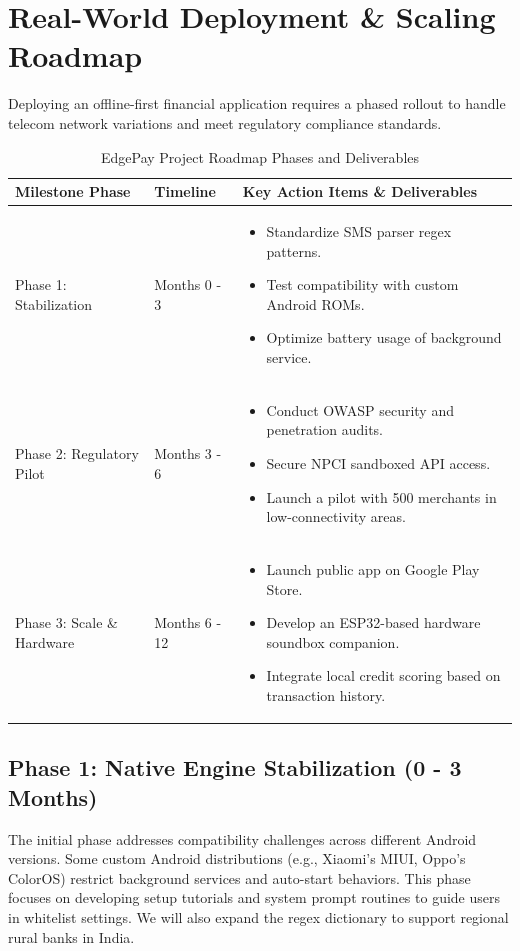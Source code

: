 \documentclass[10pt,journal,compsoc]{IEEEtran}
\begin{document}
\section{Real-World Deployment \& Scaling Roadmap}
Deploying an offline-first financial application requires a phased rollout to handle telecom network variations and meet regulatory compliance standards.

\begin{table}[htbp]
\caption{EdgePay Project Roadmap Phases and Deliverables}
\label{tab:roadmap_milestones}
\centering
\scriptsize
\begin{tabular}{lp{2.5cm}p{9.5cm}}
\toprule
\textbf{Milestone Phase} & \textbf{Timeline} & \textbf{Key Action Items \& Deliverables} \\
\midrule
Phase 1: Stabilization & Months 0 - 3 & \begin{itemize} \item Standardize SMS parser regex patterns. \item Test compatibility with custom Android ROMs. \item Optimize battery usage of background service. \end{itemize} \\
\midrule
Phase 2: Regulatory Pilot & Months 3 - 6 & \begin{itemize} \item Conduct OWASP security and penetration audits. \item Secure NPCI sandboxed API access. \item Launch a pilot with 500 merchants in low-connectivity areas. \end{itemize} \\
\midrule
Phase 3: Scale \& Hardware & Months 6 - 12 & \begin{itemize} \item Launch public app on Google Play Store. \item Develop an ESP32-based hardware soundbox companion. \item Integrate local credit scoring based on transaction history. \end{itemize} \\
\bottomrule
\end{tabular}
\end{table}

\subsection{Phase 1: Native Engine Stabilization (0 - 3 Months)}
The initial phase addresses compatibility challenges across different Android versions. Some custom Android distributions (e.g., Xiaomi's MIUI, Oppo's ColorOS) restrict background services and auto-start behaviors. This phase focuses on developing setup tutorials and system prompt routines to guide users in whitelist settings. We will also expand the regex dictionary to support regional rural banks in India.
\end{document}
